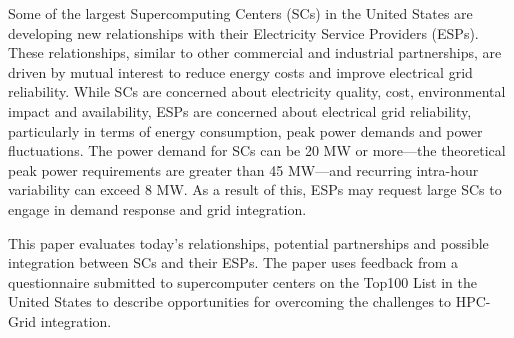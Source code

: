 Some of the largest Supercomputing Centers (SCs) in the United States are developing new relationships with their Electricity Service Providers (ESPs). These relationships, similar to other commercial and industrial partnerships, are driven by mutual interest to reduce energy costs and improve electrical grid reliability. While SCs are concerned about electricity quality, cost, environmental impact and availability, ESPs are concerned about electrical grid reliability, particularly in terms of energy consumption, peak power demands and power fluctuations. The power demand for SCs can be 20 MW or more---the theoretical peak power requirements are greater than 45 MW---and recurring intra-hour variability can exceed 8 MW. As a result of this, ESPs may request large SCs to engage in demand response and grid integration. 

This paper evaluates today's relationships, potential partnerships and possible integration between SCs and their ESPs. The paper uses feedback from a questionnaire submitted to supercomputer centers on the Top100 List in the United States to describe opportunities for overcoming the challenges to HPC-Grid integration.


%
%
%
%
%
%
